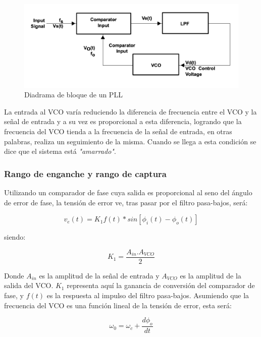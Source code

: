 \begin{figure}[h!]
	\centering
	\includegraphics[width=1\textwidth]{../1. PLL/Imagenes/Diagrama bloque PLL.png}
	\caption{Diadrama de bloque de un PLL}
	\label{DiagramaBloquePLL}
\end{figure}

La entrada al VCO varía reduciendo la diferencia de frecuencia entre el VCO y la señal de entrada y a su vez es proporcional a esta diferencia, logrando que la frecuencia del VCO tienda a la frecuencia de la señal de entrada, en otras palabras, realiza un seguimiento de la misma. Cuando se llega a esta condición se dice que el sistema está \textit{"amarrado"}.

\subsubsection{Rango de enganche y rango de captura}

Utilizando un comparador de fase cuya salida es proporcional al seno del ángulo de error de fase, la tensión de error ve, tras pasar por el filtro pasa-bajos, será:

\begin{equation}
	v_e(t) = K_1 f(t)*sin[\phi_i(t)-\phi_o(t)]
	\label{EqVe}
\end{equation}

siendo: 

\begin{equation}
	K_1 = \frac{A_{in}.A_{VCO}}{2}
\end{equation}

Donde $A_{in}$ es la amplitud de la señal de entrada y $A_{VCO}$ es la amplitud de la salida del VCO. $K_1$ representa aquí la ganancia de conversión del comparador de fase, y $f(t)$ es la respuesta al impulso del filtro pasa-bajos. Asumiendo que la frecuencia del VCO es una función lineal de la tensión de error, esta será:

\begin{equation}
	\omega_0 = \omega_c + \frac{d\phi_o}{dt}
\end{equation}

